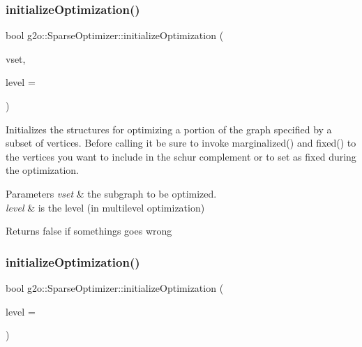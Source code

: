 \subsubsection{\texorpdfstring{initialize\+Optimization()}{initializeOptimization()}\hspace{0.1cm}{\footnotesize\ttfamily [2/3]}}
{\footnotesize\ttfamily bool g2o\+::\+Sparse\+Optimizer\+::initialize\+Optimization (\begin{DoxyParamCaption}\item[{\mbox{\hyperlink{classg2o_1_1_hyper_graph_a703938cdb4bb636860eed55a2489d70c}{Hyper\+Graph\+::\+Vertex\+Set}} \&}]{vset,  }\item[{int}]{level = {} }\end{DoxyParamCaption})\hspace{0.3cm}{\ttfamily [virtual]}}

Initializes the structures for optimizing a portion of the graph specified by a subset of vertices. Before calling it be sure to invoke marginalized() and fixed() to the vertices you want to include in the schur complement or to set as fixed during the optimization. 
\begin{DoxyParams}{Parameters}
{\em vset} & the subgraph to be optimized. \\
\hline
{\em level} & is the level (in multilevel optimization) \\
\hline
\end{DoxyParams}
\begin{DoxyReturn}{Returns}
false if somethings goes wrong 
\end{DoxyReturn}
\mbox{\label{classg2o_1_1_sparse_optimizer_ace3994bf5f403c7fa0305635aa598473}} 
\subsubsection{\texorpdfstring{initialize\+Optimization()}{initializeOptimization()}\hspace{0.1cm}{\footnotesize\ttfamily [3/3]}}
{\footnotesize\ttfamily bool g2o\+::\+Sparse\+Optimizer\+::initialize\+Optimization (\begin{DoxyParamCaption}\item[{int}]{level = {} }\end{DoxyParamCaption})\hspace{0.3cm}{\ttfamily [virtual]}}

